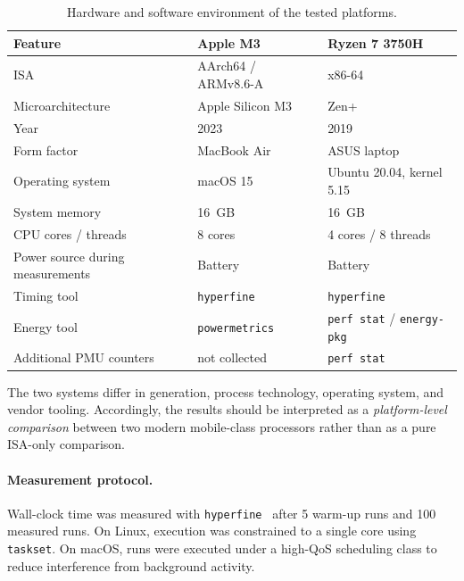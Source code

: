 \documentclass{tcsa}
\begin{document}
\begin{table}[!ht]
\centering
\caption{Hardware and software environment of the tested platforms.}
\label{tab:hardware}
\small %
\begin{tabularx}{\columnwidth}{lXX}
\toprule
Feature & Apple M3  & Ryzen 7 3750H  \\
\midrule

ISA & AArch64 / ARMv8.6-A & x86-64 \\
Microarchitecture & Apple Silicon M3 & Zen+ \\
Year & 2023 & 2019 \\
Form factor & MacBook Air & ASUS laptop \\
Operating system & macOS 15 & Ubuntu 20.04, kernel 5.15 \\
System memory & 16~GB & 16~GB \\
CPU cores / threads & 8 cores & 4 cores / 8 threads \\
Power source during measurements & Battery & Battery \\
Timing tool & \texttt{hyperfine} & \texttt{hyperfine} \\
Energy tool & \texttt{powermetrics} & \texttt{perf stat} / \texttt{energy-pkg} \\
Additional PMU counters & not collected & \texttt{perf stat} \\
\bottomrule
\end{tabularx}
\end{table}





The two systems differ in generation, process technology, operating
system, and vendor tooling. Accordingly, the results should be
interpreted as a \emph{platform-level comparison} between two modern
mobile-class processors rather than as a pure ISA-only comparison.

\paragraph{Measurement protocol.}
Wall-clock time was measured with \texttt{hyperfine}~\cite{hyperfine}
after 5 warm-up runs and 100 measured runs. On Linux, execution was
constrained to a single core using \texttt{taskset}. On macOS, runs
were executed under a high-QoS scheduling class to reduce interference
from background activity.
\end{document}
